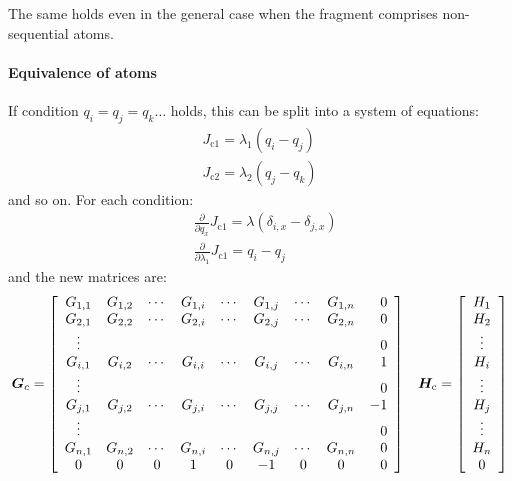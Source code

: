 \documentclass[a4paper]{report}
\newcommand{\bs}{\boldsymbol}
\newcommand{\mr}{\mathrm}
\begin{document}
The same holds even in the general case when the fragment comprises non-sequential
atoms.

\paragraph{Equivalence of atoms}

If condition $q_i = q_j = q_k \dots$ holds, this can be split into a system of
equations:
\begin{align}
J_{\mr{c}1} = \lambda_1 \left( q_i - q_j \right) \nonumber \\
J_{\mr{c}2} = \lambda_2 \left( q_j - q_k \right) \nonumber 
\end{align}
and so on. For each condition:
\begin{align}
&\frac{\partial}{\partial q_x} J_{\mr{c}1} = \lambda (\delta_{i,x} - \delta_{j,x}) \\
&\frac{\partial}{\partial \lambda_1} J_{\mr{c}1} = q_i - q_j
\end{align}
and the new matrices are:
\begin{equation}
\bs{G}_c = \left[ \begin{array}{ccccccccr} 
G_{1,1} & G_{1,2} & \cdots & G_{1,i} & \cdots & G_{1,j} & \cdots & G_{1,n} & 0 \\
G_{2,1} & G_{2,2} & \cdots & G_{2,i} & \cdots & G_{2,j} & \cdots & G_{2,n} & 0 \\
\vdots  &         &        &         &        &         &        &         & 0 \\
G_{i,1} & G_{i,2} & \cdots & G_{i,i} & \cdots & G_{i,j} & \cdots & G_{i,n} & 1 \\
\vdots  &         &        &         &        &         &        &         & 0 \\
G_{j,1} & G_{j,2} & \cdots & G_{j,i} & \cdots & G_{j,j} & \cdots & G_{j,n} & -1 \\
\vdots  &         &        &         &        &         &        &         & 0 \\
G_{n,1} & G_{n,2} & \cdots & G_{n,i} & \cdots & G_{n,j} & \cdots & G_{n,n} & 0 \\
0       & 0       & 0      & 1       & 0      & -1      & 0      & 0       & 0 \\
\end{array} \right] \hspace{0.3cm} \bs{H}_\mr{c} = \left[ \begin{array}{c} H_1 \\ H_2
\\ \vdots \\ H_i \\ \vdots \\ H_j \\ \vdots \\ H_n \\ 0 \end{array}
\right]
\end{equation}
\end{document}
